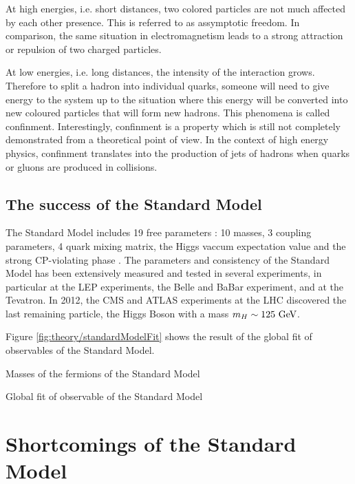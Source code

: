     At high energies, i.e. short distances, two colored particles are not much
    affected by each other presence. This is referred to as assymptotic freedom. In comparison,
    the same situation in electromagnetism leads to a strong attraction or repulsion of
    two charged particles.

    At low energies, i.e. long distances, the intensity of the interaction grows. Therefore
    to split a hadron into individual quarks, someone will need to give energy to the
    system up to the situation where this energy will be converted into new coloured
    particles that will form new hadrons. This phenomena is called confinment. Interestingly,
    confinment is a property which is still not completely demonstrated from a theoretical
    point of view. In the context of high energy physics, confinment translates into the
    production of jets of hadrons when quarks or gluons are produced in collisions.

    \subsection{The success of the Standard Model}

    The Standard Model includes 19 free parameters : 10 masses, 3 coupling parameters,
    4 quark mixing matrix, the Higgs vaccum expectation value and the strong CP-violating
    phase . The parameters and consistency of the Standard
    Model has been extensively measured and tested in several experiments, in particular
    at the LEP experiments, the Belle and BaBar experiment, and at the Tevatron. In 2012,
    the CMS and ATLAS experiments at the LHC discovered the last remaining particle, the
    Higgs Boson with a mass $m_H \sim 125~\text{GeV}$.

    Figure \ref{fig:theory/standardModelFit} shows the result of the global fit of
    observables of the Standard Model.

                 {Masses of the fermions of the Standard Model}

                  {Global fit of observable of the Standard Model}

    \section{Shortcomings of the Standard Model}
